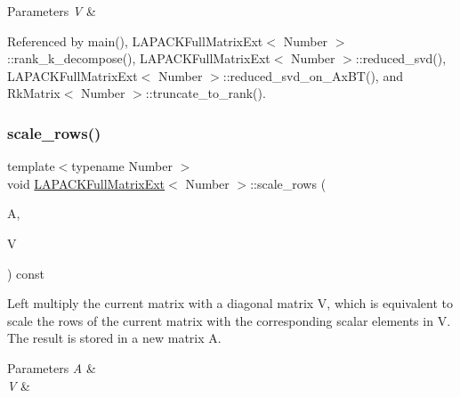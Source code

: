 \begin{DoxyParams}{Parameters}
{\em V} & \\
\hline
\end{DoxyParams}


Referenced by main(), L\+A\+P\+A\+C\+K\+Full\+Matrix\+Ext$<$ Number $>$\+::rank\+\_\+k\+\_\+decompose(), L\+A\+P\+A\+C\+K\+Full\+Matrix\+Ext$<$ Number $>$\+::reduced\+\_\+svd(), L\+A\+P\+A\+C\+K\+Full\+Matrix\+Ext$<$ Number $>$\+::reduced\+\_\+svd\+\_\+on\+\_\+\+Ax\+B\+T(), and Rk\+Matrix$<$ Number $>$\+::truncate\+\_\+to\+\_\+rank().

\mbox{\label{classLAPACKFullMatrixExt_a88b31beb3170825867a0b15b59770d61}} 
\subsubsection{\texorpdfstring{scale\+\_\+rows()}{scale\_rows()}\hspace{0.1cm}{\footnotesize\ttfamily [2/2]}}
{\footnotesize\ttfamily template$<$typename Number $>$ \\
void \hyperlink{classLAPACKFullMatrixExt}{L\+A\+P\+A\+C\+K\+Full\+Matrix\+Ext}$<$ Number $>$\+::scale\+\_\+rows (\begin{DoxyParamCaption}\item[{\hyperlink{classLAPACKFullMatrixExt}{L\+A\+P\+A\+C\+K\+Full\+Matrix\+Ext}$<$ Number $>$ \&}]{A,  }\item[{const std\+::vector$<$ typename numbers\+::\+Number\+Traits$<$ Number $>$\+::real\+\_\+type $>$ \&}]{V }\end{DoxyParamCaption}) const}

Left multiply the current matrix with a diagonal matrix {\ttfamily V}, which is equivalent to scale the rows of the current matrix with the corresponding scalar elements in {\ttfamily V}. The result is stored in a new matrix {\ttfamily A}.


\begin{DoxyParams}{Parameters}
{\em A} & \\
\hline
{\em V} & \\
\hline
\end{DoxyParams}
\mbox{\label{classLAPACKFullMatrixExt_a0ee8a3f97dc3f391f9c963d6a275a25b}} 
